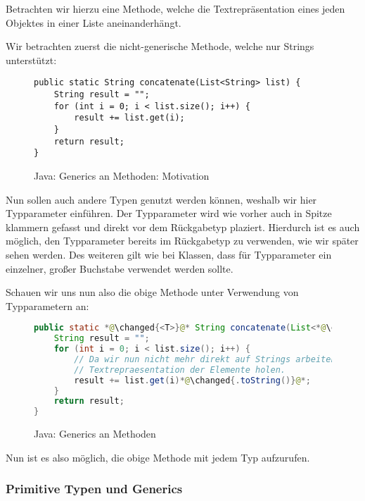 		Betrachten wir hierzu eine Methode, welche die Textrepräsentation eines jeden Objektes in einer Liste aneinanderhängt.
		
		Wir betrachten zuerst die nicht-generische Methode, welche nur Strings unterstützt:
		\begin{figure}[H]
			\centering
			\begin{lstlisting}
public static String concatenate(List<String> list) {
	String result = "";
	for (int i = 0; i < list.size(); i++) {
		result += list.get(i);
	}
	return result;
}
			\end{lstlisting}
			\caption{Java: Generics an Methoden: Motivation}
		\end{figure}
		
		Nun sollen auch andere Typen genutzt werden können, weshalb wir hier Typparameter einführen. Der Typparameter wird wie vorher auch in Spitze klammern gefasst und direkt vor dem Rückgabetyp plaziert. Hierdurch ist es auch möglich, den Typparameter bereits im Rückgabetyp zu verwenden, wie wir später sehen werden. Des weiteren gilt wie bei Klassen, dass für Typparameter ein einzelner, großer Buchstabe verwendet werden sollte.
		
		Schauen wir uns nun also die obige Methode unter Verwendung von Typparametern an:
		\begin{figure}[H]
			\centering
			\begin{lstlisting}[language = Java]
public static *@\changed{<T>}@* String concatenate(List<*@\changed{T}@*> list) {
	String result = "";
	for (int i = 0; i < list.size(); i++) {
		// Da wir nun nicht mehr direkt auf Strings arbeiten, muessen wir uns erst die
		// Textrepraesentation der Elemente holen.
		result += list.get(i)*@\changed{.toString()}@*;
	}
	return result;
}
			\end{lstlisting}
			\caption{Java: Generics an Methoden}
			\label{fig:generics_methoden}
		\end{figure}
		
		Nun ist es also möglich, die obige Methode mit jedem Typ aufzurufen.
	
	\subsubsection{Primitive Typen und Generics}
		\label{sec:generics_primitive_typen}
	
